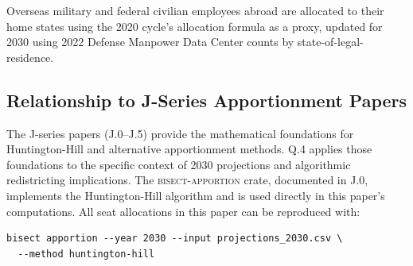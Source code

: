Overseas military and federal civilian employees abroad are allocated to their home
states using the 2020 cycle's allocation formula as a proxy, updated for 2030 using
2022 Defense Manpower Data Center counts by state-of-legal-residence.

\subsection{Relationship to J-Series Apportionment Papers}

The J-series papers (J.0--J.5) provide the mathematical foundations for Huntington-Hill
and alternative apportionment methods. Q.4 applies those foundations to the specific
context of 2030 projections and algorithmic redistricting implications. The
\textsc{bisect-apportion} crate, documented in J.0, implements the Huntington-Hill
algorithm and is used directly in this paper's computations. All seat allocations
in this paper can be reproduced with:

\begin{verbatim}
bisect apportion --year 2030 --input projections_2030.csv \
  --method huntington-hill
\end{verbatim}
